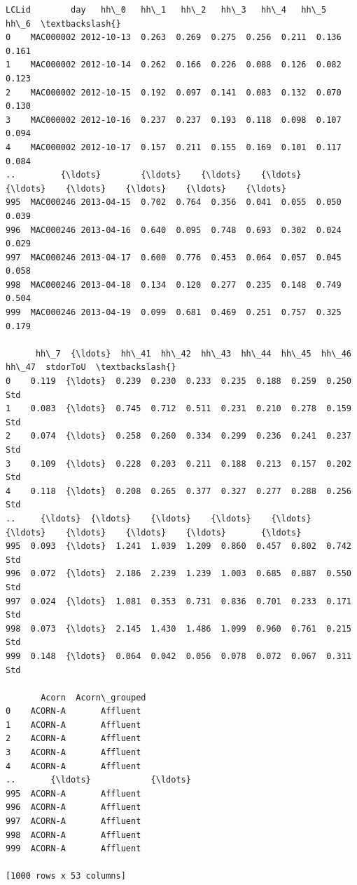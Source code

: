 \documentclass[11pt]{article}
\makeatletter
\newcommand{\boxspacing}{\kern\kvtcb@left@rule\kern\kvtcb@boxsep}
\newcommand{\prompt}[4]{
        {\ttfamily\llap{{\color{#2}[#3]:\hspace{3pt}#4}}\vspace{-\baselineskip}}
    }
\makeatother
\begin{document}
            \begin{tcolorbox}[breakable, size=fbox, boxrule=.5pt, pad at break*=1mm, opacityfill=0]
\prompt{Out}{outcolor}{83}{\boxspacing}
\begin{Verbatim}[commandchars=\\\{\}]
         LCLid        day   hh\_0   hh\_1   hh\_2   hh\_3   hh\_4   hh\_5   hh\_6  \textbackslash{}
0    MAC000002 2012-10-13  0.263  0.269  0.275  0.256  0.211  0.136  0.161
1    MAC000002 2012-10-14  0.262  0.166  0.226  0.088  0.126  0.082  0.123
2    MAC000002 2012-10-15  0.192  0.097  0.141  0.083  0.132  0.070  0.130
3    MAC000002 2012-10-16  0.237  0.237  0.193  0.118  0.098  0.107  0.094
4    MAC000002 2012-10-17  0.157  0.211  0.155  0.169  0.101  0.117  0.084
..         {\ldots}        {\ldots}    {\ldots}    {\ldots}    {\ldots}    {\ldots}    {\ldots}    {\ldots}    {\ldots}
995  MAC000246 2013-04-15  0.702  0.764  0.356  0.041  0.055  0.050  0.039
996  MAC000246 2013-04-16  0.640  0.095  0.748  0.693  0.302  0.024  0.029
997  MAC000246 2013-04-17  0.600  0.776  0.453  0.064  0.057  0.045  0.058
998  MAC000246 2013-04-18  0.134  0.120  0.277  0.235  0.148  0.749  0.504
999  MAC000246 2013-04-19  0.099  0.681  0.469  0.251  0.757  0.325  0.179

      hh\_7  {\ldots}  hh\_41  hh\_42  hh\_43  hh\_44  hh\_45  hh\_46  hh\_47  stdorToU  \textbackslash{}
0    0.119  {\ldots}  0.239  0.230  0.233  0.235  0.188  0.259  0.250       Std
1    0.083  {\ldots}  0.745  0.712  0.511  0.231  0.210  0.278  0.159       Std
2    0.074  {\ldots}  0.258  0.260  0.334  0.299  0.236  0.241  0.237       Std
3    0.109  {\ldots}  0.228  0.203  0.211  0.188  0.213  0.157  0.202       Std
4    0.118  {\ldots}  0.208  0.265  0.377  0.327  0.277  0.288  0.256       Std
..     {\ldots}  {\ldots}    {\ldots}    {\ldots}    {\ldots}    {\ldots}    {\ldots}    {\ldots}    {\ldots}       {\ldots}
995  0.093  {\ldots}  1.241  1.039  1.209  0.860  0.457  0.802  0.742       Std
996  0.072  {\ldots}  2.186  2.239  1.239  1.003  0.685  0.887  0.550       Std
997  0.024  {\ldots}  1.081  0.353  0.731  0.836  0.701  0.233  0.171       Std
998  0.073  {\ldots}  2.145  1.430  1.486  1.099  0.960  0.761  0.215       Std
999  0.148  {\ldots}  0.064  0.042  0.056  0.078  0.072  0.067  0.311       Std

       Acorn  Acorn\_grouped
0    ACORN-A       Affluent
1    ACORN-A       Affluent
2    ACORN-A       Affluent
3    ACORN-A       Affluent
4    ACORN-A       Affluent
..       {\ldots}            {\ldots}
995  ACORN-A       Affluent
996  ACORN-A       Affluent
997  ACORN-A       Affluent
998  ACORN-A       Affluent
999  ACORN-A       Affluent

[1000 rows x 53 columns]
\end{Verbatim}
\end{tcolorbox}
        
\end{document}
